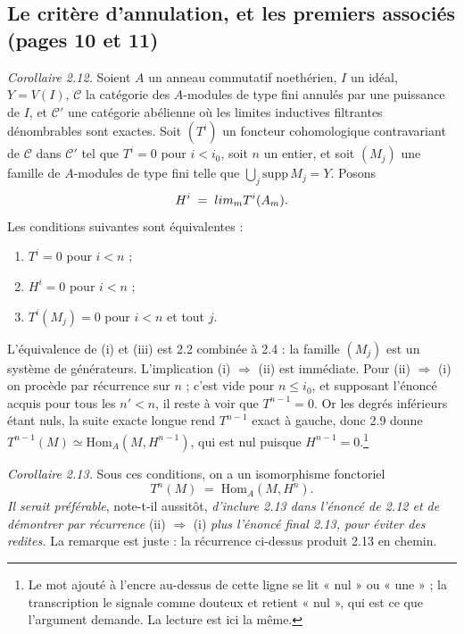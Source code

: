 \documentclass[11pt,a4paper]{article}
\begin{document}
\subsection*{Le critère d'annulation, et les premiers associés (pages 10 et 11)}

\emph{Corollaire 2.12.} Soient $A$ un anneau commutatif noethérien, $I$ un
idéal, $Y = V(I)$, $\mathcal{C}$ la catégorie des $A$-modules de type fini
annulés par une puissance de $I$, et $\mathcal{C}'$ une catégorie abélienne où
les limites inductives filtrantes dénombrables sont exactes. Soit $(T^{i})$ un
foncteur cohomologique contravariant de $\mathcal{C}$ dans $\mathcal{C}'$ tel
que $T^{i} = 0$ pour $i < i_{0}$, soit $n$ un entier, et soit $(M_{j})$ une
famille de $A$-modules de type fini telle que $\bigcup_{j} \mathrm{supp}\, M_{j}
= Y$. Posons
\[
  H^{i} \;=\; \varinjlim_{m} T^{i}(A_{m}) .
\]
Les conditions suivantes sont équivalentes :
\begin{enumerate}
  \item[(i)] $T^{i} = 0$ pour $i < n$ ;
  \item[(ii)] $H^{i} = 0$ pour $i < n$ ;
  \item[(iii)] $T^{i}(M_{j}) = 0$ pour $i < n$ et tout $j$.
\end{enumerate}

L'équivalence de (i) et (iii) est 2.2 combinée à 2.4 : la famille $(M_{j})$ est
un système de générateurs. L'implication (i) $\Rightarrow$ (ii) est immédiate.
Pour (ii) $\Rightarrow$ (i) on procède par récurrence sur $n$ ; c'est vide pour
$n \leqslant i_{0}$, et supposant l'énoncé acquis pour tous les $n' < n$, il
reste à voir que $T^{n-1} = 0$. Or les degrés inférieurs étant nuls, la suite
exacte longue rend $T^{n-1}$ exact à gauche, donc 2.9 donne $T^{n-1}(M) \simeq
\mathrm{Hom}_{A}(M, H^{n-1})$, qui est nul puisque
$H^{n-1} = 0$.\footnote{Le mot ajouté à l'encre au-dessus de cette ligne se lit
« nul » ou « une » ; la transcription le signale comme douteux et retient
« nul », qui est ce que l'argument demande. La lecture est ici la même.}

\emph{Corollaire 2.13.} Sous ces conditions, on a un isomorphisme fonctoriel
\[
  T^{n}(M) \;=\; \mathrm{Hom}_{A}(M, H^{n}) .
\]
\emph{Il serait préférable}, note-t-il aussitôt, \emph{d'inclure 2.13 dans
l'énoncé de 2.12 et de démontrer par récurrence} (ii) $\Rightarrow$ (i)
\emph{plus l'énoncé final 2.13, pour éviter des redites.} La remarque est juste :
la récurrence ci-dessus produit 2.13 en chemin.
\end{document}
